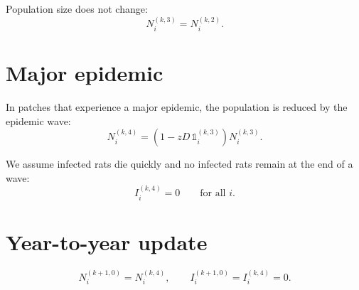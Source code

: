 \documentclass[12pt]{article}
\begin{document}
Population size does not change:
\begin{equation}
N_i^{(k,3)} = N_i^{(k,2)}.
\end{equation}

\section{Major epidemic}
In patches that experience a major epidemic, the population is reduced by the epidemic wave:
\begin{equation}
N_i^{(k,4)}=\left(1-zD\,\mathds{1}_i^{(k,3)}\right)N_i^{(k,3)}.
\end{equation}

We assume infected rats die quickly and no infected rats remain at the end of a wave:
\begin{equation}
I_i^{(k,4)} = 0 \qquad \text{for all } i.
\end{equation}

\section{Year-to-year update}
\begin{equation}
N_i^{(k+1,0)} = N_i^{(k,4)},\qquad
I_i^{(k+1,0)} = I_i^{(k,4)}=0.
\end{equation}
\end{document}
